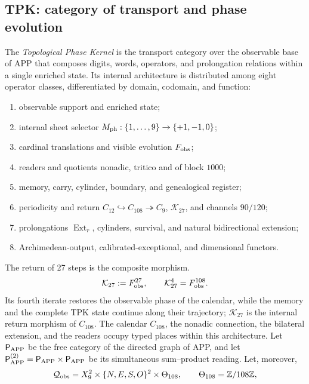 \subsection{TPK: category of transport and phase evolution}

The \emph{Topological Phase Kernel} is the transport category over the
observable base of APP that composes digits, words, operators, and prolongation
relations within a single enriched state. Its internal architecture is distributed among
eight operator classes, differentiated by domain, codomain, and function:
\begin{enumerate}[label=\textup{(\roman*)},leftmargin=2.25em]
\item observable support and enriched state;
\item internal sheet selector \(M_{\rm ph}:\{1,\ldots,9\}\to\{+1,-1,0\}\);
\item cardinal translations and visible evolution \(F_{\rm obs}\);
\item readers and quotients nonadic, tritico and of block \(1000\);
\item memory, carry, cylinder, boundary, and genealogical register;
\item periodicity and return
\(C_{12}\hookrightarrow C_{108}\twoheadrightarrow C_9\),
\(\mathcal K_{27}\), and channels \(90/120\);
\item prolongations \(\operatorname{Ext}_r\), cylinders, survival, and
natural bidirectional extension;
\item Archimedean-output, calibrated-exceptional, and dimensional functors.
\end{enumerate}
The return of 27 steps is the composite morphism.
\begin{equation}
\mathcal K_{27}:=F_{\rm obs}^{27},
\qquad \mathcal K_{27}^{4}=F_{\rm obs}^{108}.
\label{p12-83-c3-s1:eq:tpk-kernel-27}
\end{equation}
Its fourth iterate restores the observable phase of the calendar, while the
memory and the complete TPK state continue along their trajectory;
\(\mathcal K_{27}\) is the internal return morphism of \(C_{108}\).
The calendar \(C_{108}\), the nonadic connection, the bilateral extension, and
the readers occupy typed places within this architecture. Let
\(\mathsf P_{\rm APP}\) be the free category
of the directed graph of APP, and let
\(\mathsf P_{\rm APP}^{(2)}=\mathsf P_{\rm APP}\times
\mathsf P_{\rm APP}\) be its simultaneous sum--product reading. Let, moreover,
\[
\mathcal Q_{\rm obs}
=X_9^2\times\{N,E,S,O\}^2\times\Theta_{108},
\qquad \Theta_{108}=\mathbb Z/108\mathbb Z,
\]
